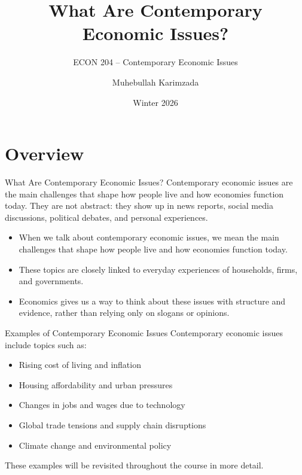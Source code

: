 \documentclass[aspectratio=169]{beamer}
\title[Contemporary Economic Issues]{What Are Contemporary Economic Issues?}
\subtitle{ECON 204 -- Contemporary Economic Issues}
\author{Muhebullah Karimzada}
\date{Winter 2026}
\begin{document}
\begin{frame}
  \transfade
  \titlepage
\end{frame}


\section{Overview}

\begin{frame}{What Are Contemporary Economic Issues?}
  \transfade
  Contemporary economic issues are the main challenges that shape how people live and how
  economies function today. They are not abstract: they show up in news reports, social
  media discussions, political debates, and personal experiences.

  \vspace{0.4cm}

  \begin{itemize}[<+->]
    \item When we talk about contemporary economic issues, we mean the main challenges that shape
    how people live and how economies function today.
    \item These topics are closely linked to everyday experiences of households, firms, and governments.
    \item Economics gives us a way to think about these issues with structure and evidence, rather than
    relying only on slogans or opinions.
  \end{itemize}
\end{frame}

\begin{frame}{Examples of Contemporary Economic Issues}
  \transfade
  Contemporary economic issues include topics such as:
  \begin{itemize}[<+->]
    \item Rising cost of living and inflation
    \item Housing affordability and urban pressures
    \item Changes in jobs and wages due to technology
    \item Global trade tensions and supply chain disruptions
    \item Climate change and environmental policy
  \end{itemize}

  \vspace{0.3cm}
  These examples will be revisited throughout the course in more detail.
\end{frame}
\end{document}

